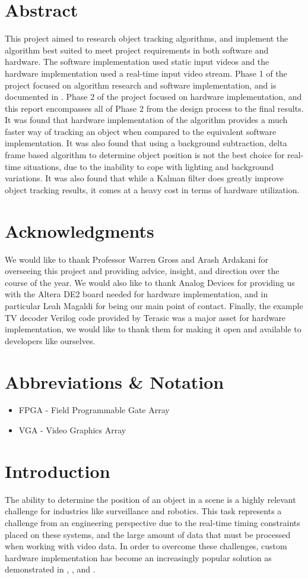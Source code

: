 \documentclass[11pt]{article} %
\begin{document}
\section*{Abstract}
This project aimed to research object tracking algorithms, and implement the algorithm best suited to meet project requirements in both software and hardware. The software implementation used static input videos and the hardware implementation used a real-time input video stream. Phase 1 of the project focused on algorithm research and software implementation, and is documented in \cite{15}. Phase 2 of the project focused on hardware implementation, and this report encompasses all of Phase 2 from the design process to the final results. It was found that hardware implementation of the algorithm provides a much faster way of tracking an object when compared to the equivalent software implementation. It was also found that using a background subtraction, delta frame based algorithm to determine object position is not the best choice for real-time situations, due to the inability to cope with lighting and background variations. It was also found that while a Kalman filter does greatly improve object tracking results, it comes at a heavy cost in terms of hardware utilization.
\section*{Acknowledgments}
We would like to thank Professor Warren Gross and Arash Ardakani for overseeing this project and providing advice, insight, and direction over the course of the year. We would also like to thank Analog Devices for providing us with the Altera DE2 board needed for hardware implementation, and in particular Leah Magaldi for being our main point of contact. Finally, the example TV decoder Verilog code provided by Terasic was a major asset for hardware implementation, we would like to thank them for making it open and available to developers like ourselves. 
\pagebreak
\tableofcontents
\pagebreak
\section{Abbreviations \& Notation}
\begin{itemize}
\item[] FPGA - Field Programmable Gate Array
\item[] VGA - Video Graphics Array
\end{itemize}
\section{Introduction}
The ability to determine the position of an object in a scene is a highly relevant challenge for industries like surveillance and robotics. This task represents a challenge from an engineering perspective due to the real-time timing constraints placed on these systems, and the large amount of data that must be processed when working with video data. In order to overcome these challenges, custom hardware implementation has become an increasingly popular solution as demonstrated in \cite{1}, \cite{2}, and \cite{3}.
\end{document}
